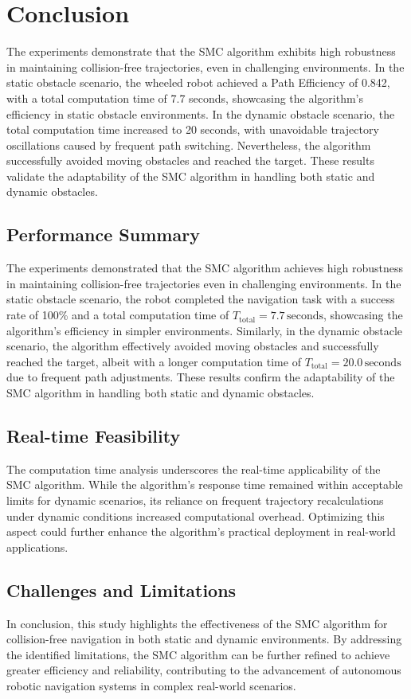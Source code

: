 \chapter{Conclusion}

The experiments demonstrate that the SMC algorithm exhibits high robustness in maintaining collision-free trajectories, even in challenging environments. In the static obstacle scenario, the wheeled robot achieved a Path Efficiency of 0.842, with a total computation time of 7.7 seconds, showcasing the algorithm's efficiency in static obstacle environments. In the dynamic obstacle scenario, the total computation time increased to 20 seconds, with unavoidable trajectory oscillations caused by frequent path switching. Nevertheless, the algorithm successfully avoided moving obstacles and reached the target. These results validate the adaptability of the SMC algorithm in handling both static and dynamic obstacles.

\section*{Performance Summary}

The experiments demonstrated that the SMC algorithm achieves high robustness in maintaining collision-free trajectories even in challenging environments. In the static obstacle scenario, the robot completed the navigation task with a success rate of 100\% and a total computation time of \(T_{\text{total}} = 7.7 \, \text{seconds}\), showcasing the algorithm’s efficiency in simpler environments. Similarly, in the dynamic obstacle scenario, the algorithm effectively avoided moving obstacles and successfully reached the target, albeit with a longer computation time of \(T_{\text{total}} = 20.0 \, \text{seconds}\) due to frequent path adjustments. These results confirm the adaptability of the SMC algorithm in handling both static and dynamic obstacles.

\section*{Real-time Feasibility}

The computation time analysis underscores the real-time applicability of the SMC algorithm. While the algorithm's response time remained within acceptable limits for dynamic scenarios, its reliance on frequent trajectory recalculations under dynamic conditions increased computational overhead. Optimizing this aspect could further enhance the algorithm’s practical deployment in real-world applications.

\section*{Challenges and Limitations}

In conclusion, this study highlights the effectiveness of the SMC algorithm for collision-free navigation in both static and dynamic environments. By addressing the identified limitations, the SMC algorithm can be further refined to achieve greater efficiency and reliability, contributing to the advancement of autonomous robotic navigation systems in complex real-world scenarios.
